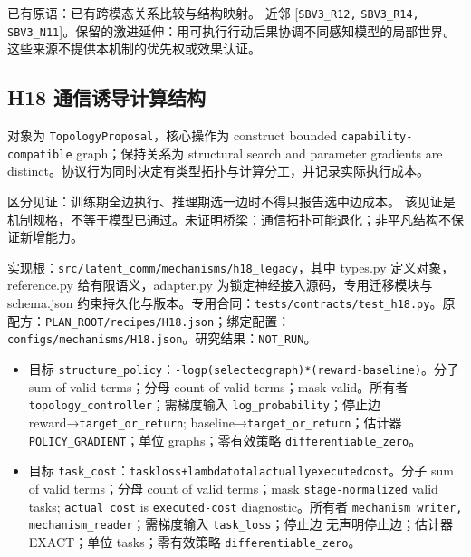 \documentclass[
  10pt,
]{article}
\begin{document}
已有原语：已有跨模态关系比较与结构映射。 近邻 {[}\nolinkurl{SBV3_R12,}
\nolinkurl{SBV3_R14,}
\nolinkurl{SBV3_N11}{]}。保留的激进延伸：用可执行行动后果协调不同感知模型的局部世界。
这些来源不提供本机制的优先权或效果认证。

\subsection{H18
通信诱导计算结构}\label{h18-ux901aux4fe1ux8bf1ux5bfcux8ba1ux7b97ux7ed3ux6784}

对象为 \nolinkurl{TopologyProposal}，核心操作为 construct bounded
\nolinkurl{capability-compatible} graph；保持关系为 structural search
and parameter gradients are
distinct。协议行为同时决定有类型拓扑与计算分工，并记录实际执行成本。

区分见证：训练期全边执行、推理期选一边时不得只报告选中边成本。
该见证是机制规格，不等于模型已通过。未证明桥梁：通信拓扑可能退化；非平凡结构不保证新增能力。

实现根：{\small\nolinkurl{src/latent_comm/mechanisms/h18_legacy}}，其中
types.py 定义对象，reference.py 给有限语义，adapter.py
为锁定神经接入源码，专用迁移模块与 schema.json
约束持久化与版本。专用合同：{\small\nolinkurl{tests/contracts/test_h18.py}}。原配方：{\small\nolinkurl{PLAN_ROOT/recipes/H18.json}}；绑定配置：{\small\nolinkurl{configs/mechanisms/H18.json}}。研究结果：\nolinkurl{NOT_RUN}。

\begin{itemize}
\item
  目标
  \nolinkurl{structure_policy}：{\small\nolinkurl{-log}\hspace{0.333em}\nolinkurl{p(selected}\hspace{0.333em}\nolinkurl{graph)*(reward-baseline)}}。分子
  sum of valid terms；分母 count of valid terms；mask valid。所有者
  \nolinkurl{topology_controller}；需梯度输入
  \nolinkurl{log_probability}；停止边
  reward→\nolinkurl{target_or_return};
  baseline→\nolinkurl{target_or_return}；估计器
  \nolinkurl{POLICY_GRADIENT}；单位 graphs；零有效策略
  \nolinkurl{differentiable_zero}。
\item
  目标
  \nolinkurl{task_cost}：{\small\nolinkurl{task}\hspace{0.333em}\nolinkurl{loss}\hspace{0.333em}\nolinkurl{+}\hspace{0.333em}\nolinkurl{lambda}\hspace{0.333em}\nolinkurl{total}\hspace{0.333em}\nolinkurl{actually}\hspace{0.333em}\nolinkurl{executed}\hspace{0.333em}\nolinkurl{cost}}。分子
  sum of valid terms；分母 count of valid terms；mask
  \nolinkurl{stage-normalized} valid tasks; \nolinkurl{actual_cost} is
  \nolinkurl{executed-cost} diagnostic。所有者
  \nolinkurl{mechanism_writer,} \nolinkurl{mechanism_reader}；需梯度输入
  \nolinkurl{task_loss}；停止边 无声明停止边；估计器 EXACT；单位
  tasks；零有效策略 \nolinkurl{differentiable_zero}。
\end{itemize}
\end{document}

